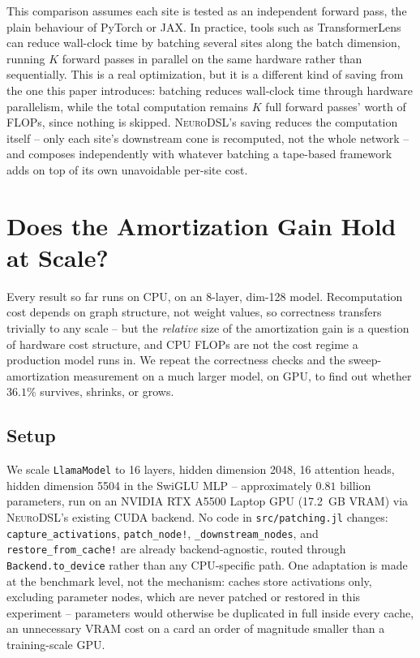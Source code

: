 \documentclass{article}
\begin{document}
This comparison assumes each site is tested as an independent forward pass, the plain behaviour
of PyTorch or JAX. In practice, tools such as TransformerLens can reduce wall-clock time by
batching several sites along the batch dimension, running $K$ forward passes in parallel on the
same hardware rather than sequentially. This is a real optimization, but it is a different kind of
saving from the one this paper introduces: batching reduces wall-clock time through hardware
parallelism, while the total computation remains $K$ full forward passes' worth of FLOPs, since
nothing is skipped. \textsc{NeuroDSL}'s saving reduces the computation itself -- only each site's
downstream cone is recomputed, not the whole network -- and composes independently with whatever
batching a tape-based framework adds on top of its own unavoidable per-site cost.

\section{Does the Amortization Gain Hold at Scale?}
\label{sec:gpuscale}

Every result so far runs on CPU, on an 8-layer, dim-128 model. Recomputation cost depends on graph
structure, not weight values, so correctness transfers trivially to any scale -- but the
\emph{relative} size of the amortization gain is a question of hardware cost structure, and CPU
FLOPs are not the cost regime a production model runs in. We repeat the correctness checks and the
sweep-amortization measurement on a much larger model, on GPU, to find out whether $36.1\%$
survives, shrinks, or grows.

\subsection{Setup}

We scale \texttt{LlamaModel} to 16 layers, hidden dimension 2048, 16 attention heads, hidden
dimension 5504 in the SwiGLU MLP -- approximately $0.81$ billion parameters, run on an NVIDIA RTX
A5500 Laptop GPU (17.2~GB VRAM) via \textsc{NeuroDSL}'s existing CUDA backend. No code in
\texttt{src/patching.jl} changes: \texttt{capture\_activations}, \texttt{patch\_node!},
\texttt{\_downstream\_nodes}, and \texttt{restore\_from\_cache!} are already backend-agnostic,
routed through \texttt{Backend.to\_device} rather than any CPU-specific path. One adaptation is
made at the benchmark level, not the mechanism: caches store activations only, excluding parameter
nodes, which are never patched or restored in this experiment -- parameters would otherwise be
duplicated in full inside every cache, an unnecessary VRAM cost on a card an order of magnitude
smaller than a training-scale GPU.
\end{document}

